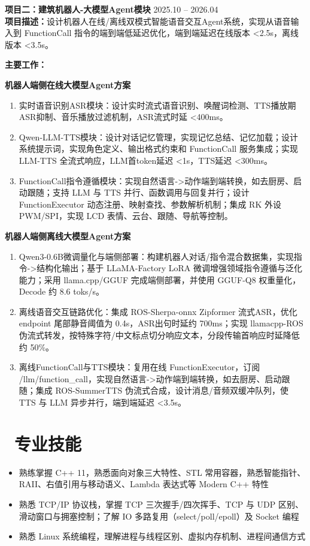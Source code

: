 \documentclass[10pt]{article}
\newlength{\interProjectSpacing}
\newcommand{\projectsep}{\vspace{\interProjectSpacing}}
\newcommand{\titlebreak}{\\[-0.08em]}
\begin{document}
{\projectsep

\textbf{项目二：建筑机器人-大模型Agent模块} \hfill 2025.10 -- 2026.04 \titlebreak
\textbf{项目描述：}设计机器人在线/离线双模式智能语音交互Agent系统，实现从语音输入到 FunctionCall 指令的端到端低延迟优化，端到端延迟在线版本 \textless{}2.5s，离线版本 \textless{}3.5s。

\vspace{0.10em}
\textbf{主要工作：}

\textbf{机器人端侧在线大模型Agent方案}
\begin{enumerate}
    \item 实时语音识别ASR模块：设计实时流式语音识别、唤醒词检测、TTS播放期ASR抑制、音乐播放过滤机制，ASR流式时延 \textless{}400ms。
    \item Qwen-LLM-TTS模块：设计对话记忆管理，实现记忆总结、记忆加载；设计系统提示词，实现角色定义、输出格式约束和 FunctionCall 服务集成；实现 LLM-TTS 全流式响应，LLM首token延迟 \textless{}1s，TTS延迟 \textless{}300ms。
    \item FunctionCall指令遵循模块：实现自然语言-\textgreater{}动作端到端转换，如去厨房、启动跟随；支持 LLM 与 TTS 并行、函数调用与回复并行；设计 FunctionExecutor 动态注册、映射查找、参数解析机制；集成 RK 外设 PWM/SPI，实现 LCD 表情、云台、跟随、导航等控制。
\end{enumerate}

\textbf{机器人端侧离线大模型Agent方案}
\begin{enumerate}
    \item Qwen3-0.6B微调量化与端侧部署：构建机器人对话/指令混合数据集，实现指令-\textgreater{}结构化输出；基于 LLaMA-Factory LoRA 微调增强领域指令遵循与泛化能力；采用 llama.cpp/GGUF 完成端侧部署，并使用 GGUF-Q8 权重量化，Decode 约 8.6 toks/s。
    \item 离线语音交互链路优化：集成 ROS-Sherpa-onnx Zipformer 流式ASR，优化 endpoint 尾部静音阈值为 0.4s，ASR出句时延约 700ms；实现 llamacpp-ROS 伪流式转发，按特殊字符/中文标点切分响应文本，分段传输首响应时延降低约 50\%。
    \item 离线FunctionCall与TTS模块：复用在线 FunctionExecutor，订阅 /llm/function\_call，实现自然语言-\textgreater{}动作端到端转换，如去厨房、启动跟随；集成 ROS-SummerTTS 伪流式合成，设计消息/音频双缓冲队列，使 TTS 与 LLM 异步并行，端到端延迟 \textless{}3.5s。
\end{enumerate}

\section{\makebox[\widthof{\faCogs}][c]{\color{CVBlue}\faCogs}\ 专业技能}
\begin{itemize}
    \item 熟练掌握 C++ 11，熟悉面向对象三大特性、STL 常用容器，熟悉智能指针、RAII、右值引用与移动语义、Lambda 表达式等 Modern C++ 特性
    \item 熟悉 TCP/IP 协议栈，掌握 TCP 三次握手/四次挥手、TCP 与 UDP 区别、滑动窗口与拥塞控制；了解 IO 多路复用（select/poll/epoll）及 Socket 编程
    \item 熟悉 Linux 系统编程，理解进程与线程区别、虚拟内存机制、进程间通信方式
\end{itemize}

}
\end{document}
